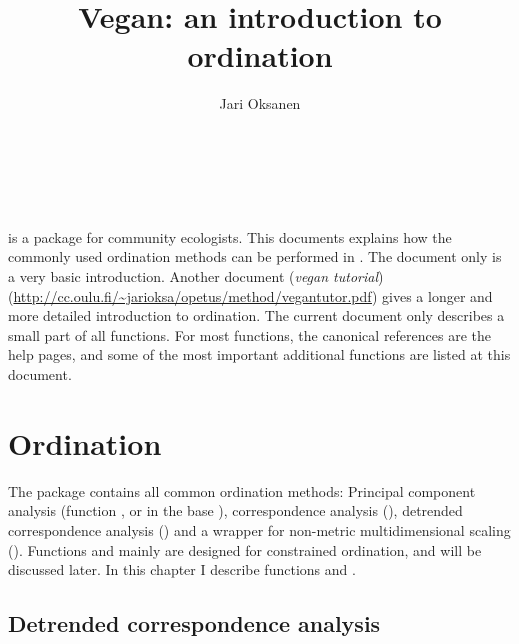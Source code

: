 \documentclass[article,nojss]{jss}
\title{Vegan: an introduction to ordination}
\author{Jari Oksanen}
\begin{document}


\tableofcontents

\section*{~}

 is a package for community ecologists.  This
documents explains how the commonly used ordination methods can be
performed in .  The document only is a very basic
introduction.  Another document (\emph{vegan tutorial})
(\url{http://cc.oulu.fi/~jarioksa/opetus/method/vegantutor.pdf}) gives
a longer and more detailed introduction to ordination.  The
current document only describes a small part of all 
functions.  For most functions, the canonical references are the
 help pages, and some of the most important additional
functions are listed at this document.

\section{Ordination}

The  package contains all common ordination methods:
Principal component analysis (function , or  in
the base ), correspondence analysis (),
detrended correspondence analysis () and a wrapper for
non-metric multidimensional scaling ().  Functions
 and  mainly are designed for constrained
ordination, and will be discussed later.  In this chapter I describe
functions  and .

\subsection{Detrended correspondence analysis}
\end{document}
